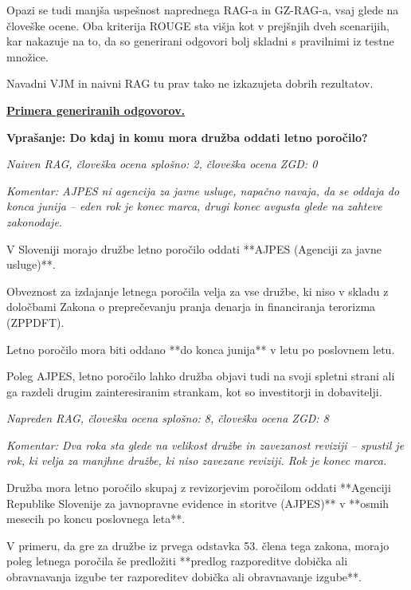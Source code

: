 \documentclass[a4paper,12pt,openright]{book}
\begin{document}
Opazi se tudi manjša uspešnost naprednega RAG-a in GZ-RAG-a, vsaj glede na človeške ocene. Oba kriterija ROUGE sta višja kot v prejšnjih dveh scenarijih, kar nakazuje na to, da so generirani odgovori bolj skladni s pravilnimi iz testne množice.

Navadni VJM in naivni RAG tu prav tako ne izkazujeta dobrih rezultatov.

\underline{\textbf{Primera generiranih odgovorov.}}

\textbf{Vprašanje: Do kdaj in komu mora družba oddati letno poročilo?}

\textit{Naiven RAG, človeška ocena splošno: 2, človeška ocena ZGD: 0}

\textit{Komentar: AJPES ni agencija za javne usluge, napačno navaja, da se oddaja do konca junija – eden rok je konec marca, drugi konec avgusta glede na zahteve zakonodaje.}

\begin{mdframed}[linewidth=1pt]
	\raggedright
	\ttfamily
	V Sloveniji morajo družbe letno poročilo oddati **AJPES (Agenciji za javne usluge)**.

	Obveznost za izdajanje letnega poročila velja za vse družbe, ki niso v skladu z določbami Zakona o preprečevanju pranja denarja in financiranja terorizma (ZPPDFT).

	Letno poročilo mora biti oddano **do konca junija** v letu po poslovnem letu.

	Poleg AJPES, letno poročilo lahko družba objavi tudi na svoji spletni strani ali ga razdeli drugim zainteresiranim strankam, kot so investitorji in dobavitelji.
\end{mdframed}

\textit{Napreden RAG, človeška ocena splošno: 8, človeška ocena ZGD: 8}

\textit{Komentar: Dva roka sta glede na velikost družbe in zavezanost reviziji – spustil je rok, ki velja za manjhne družbe, ki niso zavezane reviziji. Rok je konec marca.}

\begin{mdframed}[linewidth=1pt]
	\raggedright
	\ttfamily
	Družba mora letno poročilo skupaj z revizorjevim poročilom oddati **Agenciji Republike Slovenije za javnopravne evidence in storitve (AJPES)** v **osmih mesecih po koncu poslovnega leta**.


	V primeru, da gre za družbe iz prvega odstavka 53. člena tega zakona, morajo poleg letnega poročila še predložiti **predlog razporeditve dobička ali obravnavanja izgube ter razporeditev dobička ali obravnavanje izgube**.
\end{mdframed}
\end{document}
